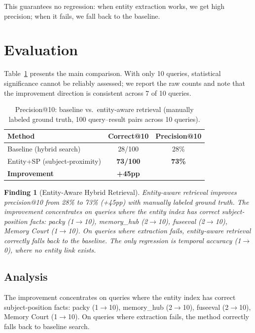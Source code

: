 \documentclass[11pt]{article}
\newtheorem{finding}{Finding}
\begin{document}
This guarantees no regression: when entity extraction works, we get high precision; when it fails, we fall back to the baseline.

\section{Evaluation}

Table~\ref{tab:results} presents the main comparison. With only 10 queries, statistical significance cannot be reliably assessed; we report the raw counts and note that the improvement direction is consistent across 7 of 10 queries.

\begin{table}[h]
\centering
\caption{Precision@10: baseline vs.\ entity-aware retrieval (manually labeled ground truth, 100 query--result pairs across 10 queries).}
\label{tab:results}
\begin{tabular}{lcc}
\toprule
Method & Correct@10 & Precision@10 \\
\midrule
Baseline (hybrid search) & 28/100 & 28\% \\
Entity+SP (subject-proximity) & \textbf{73/100} & \textbf{73\%} \\
\midrule
\textbf{Improvement} & \textbf{+45pp} & \\
\bottomrule
\end{tabular}
\end{table}

\begin{finding}[Entity-Aware Hybrid Retrieval]
Entity-aware retrieval improves precision@10 from 28\% to 73\% (+45pp) with manually labeled ground truth. The improvement concentrates on queries where the entity index has correct subject-position facts: packy (1$\to$10), memory\_hub (2$\to$10), fuseeval (2$\to$10), Memory Court (1$\to$10). On queries where extraction fails, entity-aware retrieval correctly falls back to the baseline. The only regression is temporal accuracy (1$\to$0), where no entity link exists.
\end{finding}

\subsection{Analysis}

The improvement concentrates on queries where the entity index has correct subject-position facts: packy (1$\to$10), memory\_hub (2$\to$10), fuseeval (2$\to$10), Memory Court (1$\to$10). On queries where extraction fails, the method correctly falls back to baseline search.
\end{document}
